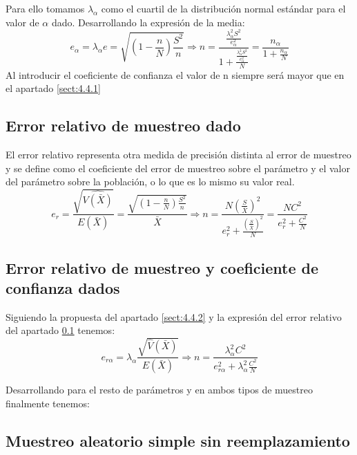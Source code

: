 Para ello tomamos $\lambda_\alpha$ como el cuartil de la distribución normal estándar para el valor de $\alpha$ dado. Desarrollando la expresión de la media:\\
\begin{equation}
    e_\alpha = \lambda_\alpha e= \sqrt{(1-\frac{n}{N})\frac{S^2}{n}} \Rightarrow n = \frac{\frac{\lambda_\alpha^2S^2}{e_\alpha^2}}{1+\frac{\frac{\lambda_\alpha^2S^2}{e_\alpha^2}}{N}} = \frac{n_\alpha}{1+\frac{n_\alpha}{N}} 
\end{equation}
Al introducir el coeficiente de confianza el valor de n siempre será mayor que en el apartado \ref{sect:4.4.1}\\

\subsection{Error relativo de muestreo dado}\label{sect:4.4.3}
El error relativo representa otra medida de precisión distinta al error de muestreo y se define como el coeficiente del error de muestreo sobre el parámetro y el valor del parámetro sobre la población, o lo que es lo mismo su valor real.\\
\begin{equation}
    e_r = \frac{ \sqrt{\widehat{V(\bar{X})}} }{E(\bar{X})} = \frac{\sqrt{(1-\frac{n}{N})\frac{S^2}{n}}}{\bar{X}} \Rightarrow n = \frac{N(\frac{S}{\bar{X}})^2}{e_r^2+\frac{(\frac{S}{\bar{X}})^2}{N}} = \frac{NC^2}{e_r^2+\frac{C^2}{N}}
\end{equation}
    
\subsection{Error relativo de muestreo y coeficiente de confianza dados}
Siguiendo la propuesta del apartado \ref{sect:4.4.2} y la expresión del error relativo del apartado \ref{sect:4.4.3} tenemos: \\
\begin{equation}
    e_{r\alpha} = \lambda_\alpha \frac{ \sqrt{\hat{V}(\bar{X})} }{E(\bar{X})} \Rightarrow n = \frac{\lambda_\alpha^2 C^2}{e_{r\alpha}^2 + \lambda_\alpha^2\frac{C^2}{N}}
\end{equation}

Desarrollando para el resto de parámetros y en ambos tipos de muestreo finalmente tenemos:\\
\subsection{Muestreo aleatorio simple sin reemplazamiento}

